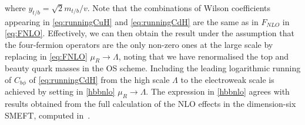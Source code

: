 	where $y_{t/b}=\sqrt{2} m_{t/b}/v$.
	Note that the combinations of Wilson coefficients appearing in \eqref{eq:runningCuH} and \eqref{eq:runningCdH} are the same as in $F_{NLO}$ in \eqref{eq:FNLO}.
	Effectively, we can then obtain the result under the assumption that the four-fermion operators are the only non-zero ones at the large scale by replacing in \eqref{eq:FNLO} $\mu_R \to \Lambda$, noting that we have renormalised the top and beauty quark masses in the OS scheme.
	Including the leading logarithmic running of $C_{b\phi}$ of \eqref{eq:runningCdH} from the high scale $\Lambda$ to the electroweak scale is achieved by setting in \eqref{hbbnlo} $\mu_R\to \Lambda$.
	The expression in \eqref{hbbnlo} agrees with results obtained from the full calculation of the NLO effects in the dimension-six SMEFT, computed in~\cite{Gauld:2015lmb}. 
